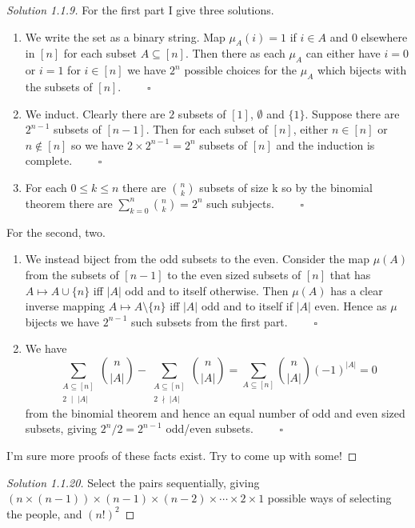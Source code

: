 \documentclass{article}
\begin{document}
\begin{proof}[Solution 1.1.9]
    For the first part I give three solutions.
    \begin{enumerate}
        \item We write the set as a binary string. 
        Map $\mu_A(i) = 1$  if $i \in A$ and $0$ elsewhere in $[n]$ for each subset $A \subseteq [n]$. Then there as each $\mu_A$ 
        can either have $i = 0$ or $i = 1$ for $i \in [n]$ we have $2^n$ possible choices for the $\mu_A$ which bijects with the subsets 
        of $[n]$. $\qquad \square$
        \item We induct. 
        Clearly there are $2$ subsets of $[1]$, $\emptyset$ and $\{1\}$. Suppose there are $2^{n-1}$ subsets of $[n-1]$. Then for each subset
        of $[n]$, either $n \in [n]$ or $n \notin [n]$ so we have $2 \times 2^{n-1} =2^n$ subsets of $[n]$ and the induction is complete. $\qquad \square$
        \item For each $0 \leq k \leq n$ there are $\binom{n}{k}$ subsets of size k so by the binomial theorem there are 
        $\sum_{k = 0}^n \binom{n}{k} = 2^n$ such subjects. $\qquad \square$ 
    \end{enumerate}
    For the second, two. 
    \begin{enumerate}
        \item We instead biject from the odd subsets to the even. Consider the map $\mu(A)$ from the subsets of $[n-1]$ to the even sized 
        subsets of $[n]$ that has $A \mapsto A \cup \{n\}$ iff $|A|$ odd and to itself otherwise. Then $\mu(A)$ has a clear inverse 
        mapping $A \mapsto A \setminus \{n\}$ iff $|A|$ odd and to itself if $|A|$ even. Hence as $\mu$ bijects we have $2^{n-1}$ such 
        subsets from the first part. $\qquad \square$
        \item We have 
        \[\sum_{\substack{A \subseteq [n] \\ 2 \;  \mid \; |A|}}\binom{n}{|A|} - \sum_{\substack{A \subseteq [n] \\ 2 \; \nmid \; |A|}}\binom{n}{|A|}
        = \sum_{A \subseteq [n]} \binom{n}{|A|}(-1)^{|A|} = 0\] 
        from the binomial theorem and hence an equal number of odd and even sized subsets, giving $2^n / 2 = 2^{n-1}$ odd/even subsets. $\qquad \square$
    \end{enumerate}
    I'm sure more proofs of these facts exist. Try to come up with some!
\end{proof}

\begin{proof}[Solution 1.1.20]
    Select the pairs sequentially, giving $(n \times (n-1)) \times (n-1) \times (n-2) \times \cdots \times 2 \times 1$ 
    possible ways of selecting the people, and $(n!)^2$  
\end{proof}
\end{document}
